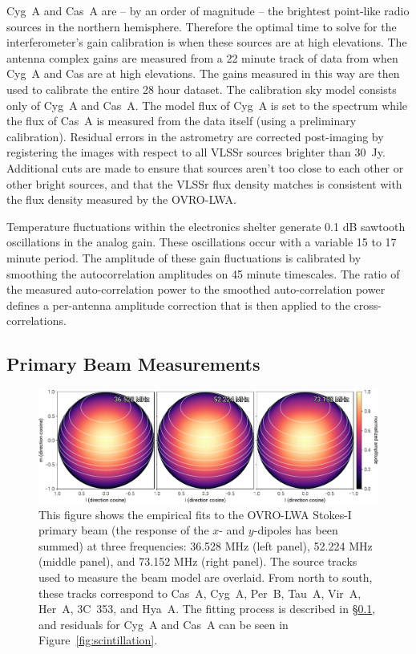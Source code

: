 \documentclass[twocolumn]{aastex61}
\begin{document}
Cyg~A and Cas~A are -- by an order of magnitude -- the brightest point-like radio sources in the
northern hemisphere. Therefore the optimal time to solve for the interferometer's gain calibration
is when these sources are at high elevations.  The antenna complex gains are measured from a 22
minute track of data from when Cyg~A and Cas are at high elevations. The gains measured in this way
are then used to calibrate the entire 28 hour dataset. The calibration sky model consists only of
Cyg~A and Cas~A. The model flux of Cyg~A is set to the \citet{1977A&A....61...99B} spectrum while
the flux of Cas~A is measured from the data itself (using a preliminary calibration).  Residual
errors in the astrometry are corrected post-imaging by registering the images with respect to all
VLSSr \citep{2014MNRAS.440..327L} sources brighter than 30~Jy. Additional cuts are made to ensure
that sources aren't too close to each other or other bright sources, and that the VLSSr flux density
matches is consistent with the flux density measured by the OVRO-LWA.

Temperature fluctuations within the electronics shelter generate 0.1 dB sawtooth oscillations in the
analog gain. These oscillations occur with a variable 15 to 17 minute period. The amplitude of these
gain fluctuations is calibrated by smoothing the autocorrelation amplitudes on 45 minute timescales.
The ratio of the measured auto-correlation power to the smoothed auto-correlation power defines a
per-antenna amplitude correction that is then applied to the cross-correlations.

\subsection{Primary Beam Measurements}\label{sec:beam}

\begin{figure}[t]
    \includegraphics[width=\textwidth]{figures/beam/beam}
    \caption{
        This figure shows the empirical fits to the OVRO-LWA Stokes-I primary beam (the response of
        the $x$- and $y$-dipoles has been summed) at three frequencies: 36.528 MHz (left panel),
        52.224 MHz (middle panel), and 73.152 MHz (right panel). The source tracks used to measure
        the beam model are overlaid. From north to south, these tracks correspond to Cas~A, Cyg~A,
        Per~B, Tau~A, Vir~A, Her~A, 3C~353, and Hya~A.  The fitting process is described in
        \S\ref{sec:beam}, and residuals for Cyg~A and Cas~A can be seen in
        Figure~\ref{fig:scintillation}.
    }
    \label{fig:beam}
\end{figure}
\end{document}
